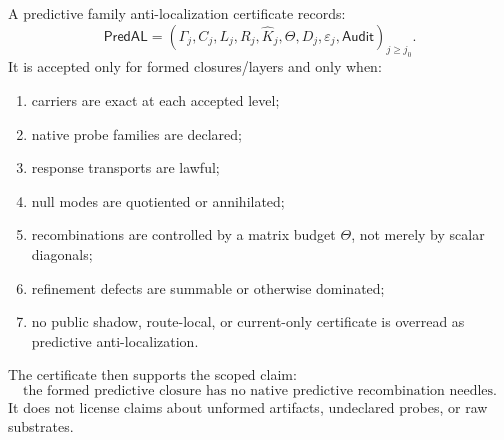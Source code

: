 \documentclass[11pt]{article}
\begin{document}
A predictive family anti-localization certificate records:
\[
\mathsf{PredAL}=(\Gamma_j,C_j,L_j,R_j,\widehat K_j,\Theta,D_j,\varepsilon_j,\mathsf{Audit})_{j\ge j_0}.
\]
It is accepted only for formed closures/layers and only when:
\begin{enumerate}[label=(\roman*)]
\item carriers are exact at each accepted level;
\item native probe families are declared;
\item response transports are lawful;
\item null modes are quotiented or annihilated;
\item recombinations are controlled by a matrix budget \(\Theta\), not merely by scalar diagonals;
\item refinement defects are summable or otherwise dominated;
\item no public shadow, route-local, or current-only certificate is overread as predictive anti-localization.
\end{enumerate}
The certificate then supports the scoped claim:
\[
\boxed{\text{the formed predictive closure has no native predictive recombination needles.}}
\]
It does not license claims about unformed artifacts, undeclared probes, or raw substrates.
\end{document}
